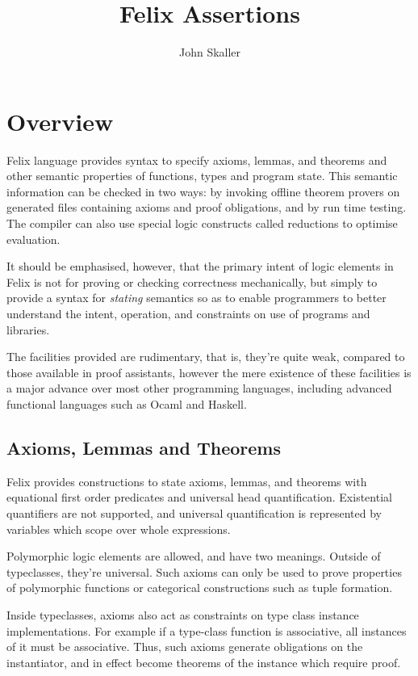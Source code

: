 \documentclass{report}
\title{Felix Assertions}
\author{John Skaller}
\begin{document}
\maketitle
\tableofcontents

\chapter{Overview}
Felix language provides syntax to specify axioms, lemmas, and theorems
and other semantic properties of functions, types and program state. This semantic
information can be checked in two ways: by invoking offline theorem
provers on generated files containing axioms and proof obligations,
and by run time testing. The compiler can also use special logic
constructs called reductions to optimise evaluation.

It should be emphasised, however, that the primary intent of logic
elements in Felix is not for proving or checking correctness
mechanically, but simply to provide a syntax for {\em stating}
semantics so as to enable programmers to better understand
the intent, operation, and constraints on use of programs
and libraries.

The facilities provided are rudimentary, that is, they're
quite weak, compared to those available in proof assistants,
however the mere existence of these facilities is a major
advance over most other programming languages, including
advanced functional languages such as Ocaml and Haskell.

\section{Axioms, Lemmas and Theorems}
Felix provides constructions to state axioms, lemmas,
and theorems with equational first order predicates and universal
head quantification. Existential quantifiers are not
supported, and universal quantification is represented
by variables which scope over whole expressions.

Polymorphic logic elements are allowed, and have two meanings.
Outside of typeclasses, they're universal. Such axioms can
only be used to prove properties of polymorphic functions
or categorical constructions such as tuple formation.

Inside typeclasses, axioms also act as constraints on 
type class instance implementations. For example if
a type-class function is associative, all instances
of it must be associative. Thus, such axioms generate
obligations on the instantiator, and in effect become
theorems of the instance which require proof.
\end{document}

